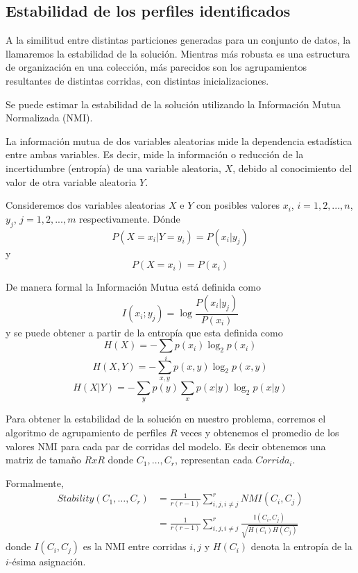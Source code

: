 \subsection{Estabilidad de los perfiles identificados}

A la similitud entre distintas particiones generadas para un conjunto de datos, la llamaremos la estabilidad de la solución. Mientras más robusta es una estructura de organización en una colección, más parecidos son los agrupamientos resultantes de distintas corridas, con distintas inicializaciones.

Se puede estimar la estabilidad de la solución utilizando la Información Mutua Normalizada (NMI).

La información mutua de dos variables aleatorias mide la dependencia estadística entre ambas variables. Es decir, mide la información o reducción de la incertidumbre (entropía) de una variable aleatoria, $X$, debido al conocimiento del valor de otra variable aleatoria $Y$.

Consideremos dos variables aleatorias $X$ e $Y$ con posibles valores $x_i$, $i=1,2,...,n$, $y_j$, $j=1,2,...,m$ respectivamente. Dónde $$
{\displaystyle P(X=x_{i}|Y=y_{i})=P(x_{i}|y_{j})}$$ y $${\displaystyle P(X=x_{i})=P(x_{i})}$$

De manera formal la Información Mutua está definida como
$$ {\displaystyle I(x_{i};y_{j})=\log {\frac {P(x_{i}|y_{j})}{P(x_{i})}}} $$
y se puede obtener a partir de la entropía que esta definida como
$${\displaystyle H(X)=-\sum _{i}p(x_{i})\log _{2}p(x_{i})}$$
$${\displaystyle H(X,Y)=-\sum _{x,y}p(x,y)\log _{2}p(x,y)}$$
$${\displaystyle H(X|Y)=-\sum _{y}p(y)\sum _{x}p(x|y)\log _{2}p(x|y)}$$

Para obtener la estabilidad de la solución en nuestro problema, corremos el algoritmo de agrupamiento de perfiles $R$ veces y obtenemos el promedio de los valores NMI para cada par de corridas del modelo. Es decir obtenemos una matriz de tamaño $R x R$ donde $C_1,\ldots,C_r$, representan cada $Corrida_i$.

Formalmente, 
\begin{align}\label{eq:PNMI}
Stability(C_1,\ldots,C_r) &= \frac{1}{r(r-1)}\sum_{i,j,i\not=j}^{r}NMI(C_i,C_j) \\
 &= \frac{1}{r(r-1)}\sum_{i,j,i\not=j}^{r} \frac{\mathbb{I}(C_i,C_j)}{\sqrt{{H}(C_i){H}(C_j)}}
\end{align}
donde ${I}(C_i,C_j)$ es la NMI entre corridas $i,j$ y ${H}(C_i)$ denota la entropía de la $i$-ésima asignación.

